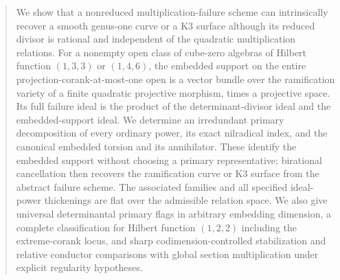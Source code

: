 \begin{abstract}
We show that a nonreduced multiplication-failure scheme can intrinsically
recover a smooth genus-one curve or a K3 surface although its reduced
divisor is rational and independent of the quadratic multiplication
relations. For a nonempty open class of cube-zero algebras of Hilbert
function $(1,3,3)$ or $(1,4,6)$, the embedded support on the entire
projection-corank-at-most-one open is a vector bundle over the
ramification variety of a finite quadratic projective morphism, times
a projective space. Its full failure ideal is the product of the
determinant-divisor ideal and the embedded-support ideal. We determine
an irredundant primary decomposition of every ordinary power, its exact
nilradical index, and the canonical embedded torsion and its annihilator.
These identify the embedded support without choosing a primary
representative; birational cancellation then recovers the ramification
curve or K3 surface from the abstract failure scheme. The associated
families and all specified ideal-power thickenings are flat over the
admissible relation space. We also give universal determinantal primary
flags in arbitrary embedding dimension, a complete classification for
Hilbert function $(1,2,2)$ including the extreme-corank locus, and sharp
codimension-controlled stabilization and relative conductor comparisons
with global section multiplication under explicit regularity hypotheses.
\end{abstract}
\maketitle
